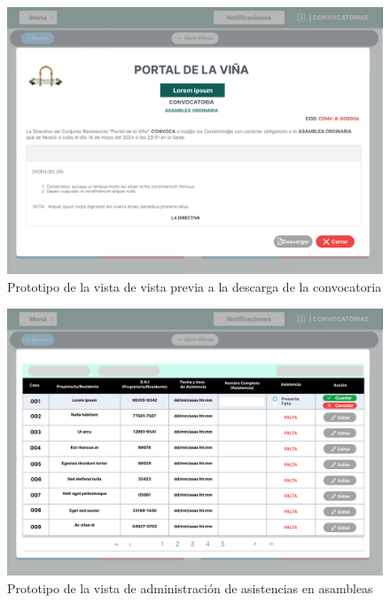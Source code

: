 \begin{figure}[H]
    \centering
    \includegraphics[width=1\textwidth]{resources/images/convocatorias_ver}
    \caption{Prototipo de la vista de vista previa a la descarga de la convocatoria}
    \label{fig:convocatorias-ver}
\end{figure}

\begin{figure}[H]
    \centering
    \includegraphics[width=1\textwidth]{resources/images/convocatorias_asistentes}
    \caption{Prototipo de la vista de administración de asistencias en asambleas}
    \label{fig:convocatorias-asistentes}
\end{figure}

